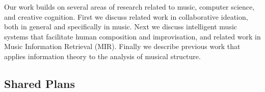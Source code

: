 \documentclass[final,authoryear,5p,times,twocolumn]{elsarticle}
\begin{document}









Our work builds on several areas of research related to music, computer science, and creative cognition. First we discuss related work in collaborative ideation, both in general and specifically in music. Next we discuss intelligent 
music systems that facilitate human composition and improvisation, and related work in Music Information Retrieval (MIR). Finally we describe previous work that applies information theory to the analysis of musical structure.

\subsection{Shared Plans}
\end{document}
